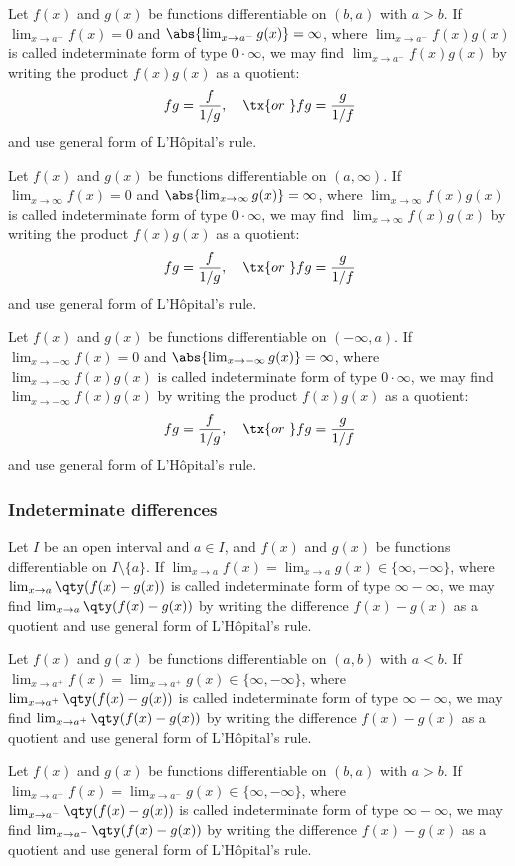 \documentclass[a4paper,12pt]{report}
\begin{document}
\begin{itemize}
\begin{itemize}
Let $f(x)$ and $g(x)$ be functions differentiable on $(b,a)$ with $a>b$. If $\lim_{x\to a^-}f(x)=0$ and $\abs{\lim_{x\to a^-}g(x)}=\infty$, where $\lim_{x\to a^-}f(x)g(x)$ is called indeterminate form of type $0\cdot\infty$, we may find $\lim_{x\to a^-}f(x)g(x)$ by writing the product $f(x)g(x)$ as a quotient:
\[fg=\frac{f}{1/g},\quad\tx{or\ }fg=\frac{g}{1/f}\]
and use general form of L'Hôpital's rule.

Let $f(x)$ and $g(x)$ be functions differentiable on $(a,\infty)$. If $\lim_{x\to\infty}f(x)=0$ and $\abs{\lim_{x\to\infty}g(x)}=\infty$, where $\lim_{x\to\infty}f(x)g(x)$ is called indeterminate form of type $0\cdot\infty$, we may find $\lim_{x\to\infty}f(x)g(x)$ by writing the product $f(x)g(x)$ as a quotient:
\[fg=\frac{f}{1/g},\quad\tx{or\ }fg=\frac{g}{1/f}\]
and use general form of L'Hôpital's rule.

Let $f(x)$ and $g(x)$ be functions differentiable on $(-\infty,a)$. If $\lim_{x\to -\infty}f(x)=0$ and $\abs{\lim_{x\to -\infty}g(x)}=\infty$, where $\lim_{x\to -\infty}f(x)g(x)$ is called indeterminate form of type $0\cdot\infty$, we may find $\lim_{x\to -\infty}f(x)g(x)$ by writing the product $f(x)g(x)$ as a quotient:
\[fg=\frac{f}{1/g},\quad\tx{or\ }fg=\frac{g}{1/f}\]
and use general form of L'Hôpital's rule.
\subsubsection{Indeterminate differences}
Let $I$ be an open interval and $a\in I$, and $f(x)$ and $g(x)$ be functions differentiable on $I\setminus\{a\}$. If $\lim_{x\to a}f(x)=\lim_{x\to a}g(x)\in\{\infty,-\infty\}$, where $\lim_{x\to a}\qty(f(x)-g(x))$ is called indeterminate form of type $\infty-\infty$, we may find $\lim_{x\to a}\qty(f(x)-g(x))$ by writing the difference $f(x)-g(x)$ as a quotient and use general form of L'Hôpital's rule.

Let $f(x)$ and $g(x)$ be functions differentiable on $(a,b)$ with $a<b$. If $\lim_{x\to a^+}f(x)=\lim_{x\to a^+}g(x)\in\{\infty,-\infty\}$, where $\lim_{x\to a^+}\qty(f(x)-g(x))$ is called indeterminate form of type $\infty-\infty$, we may find $\lim_{x\to a^+}\qty(f(x)-g(x))$ by writing the difference $f(x)-g(x)$ as a quotient and use general form of L'Hôpital's rule.

Let $f(x)$ and $g(x)$ be functions differentiable on $(b,a)$ with $a>b$. If $\lim_{x\to a^-}f(x)=\lim_{x\to a^-}g(x)\in\{\infty,-\infty\}$, where $\lim_{x\to a^-}\qty(f(x)-g(x))$ is called indeterminate form of type $\infty-\infty$, we may find $\lim_{x\to a^-}\qty(f(x)-g(x))$ by writing the difference $f(x)-g(x)$ as a quotient and use general form of L'Hôpital's rule.


\end{itemize}
\end{itemize}
\end{document}
